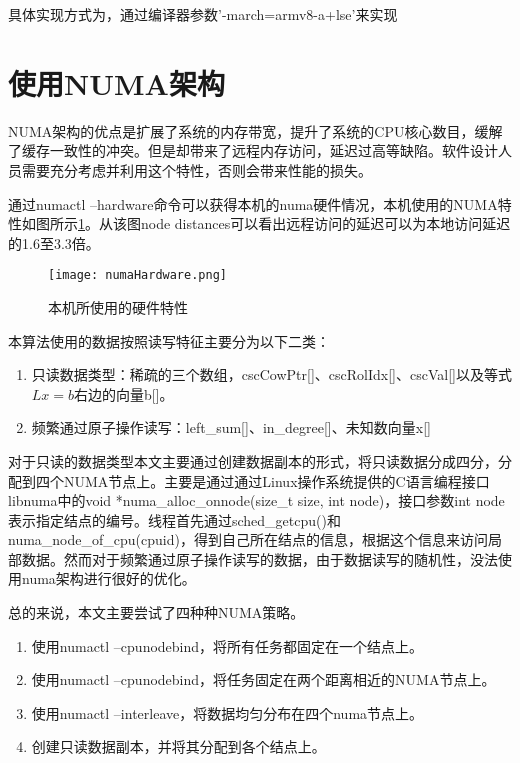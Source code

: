 具体实现方式为，通过编译器参数'-march=armv8-a+lse'来实现

\section{使用NUMA架构}

NUMA架构的优点是扩展了系统的内存带宽，提升了系统的CPU核心数目，缓解了缓存一致性的冲突。但是却带来了远程内存访问，延迟过高等缺陷。软件设计人员需要充分考虑并利用这个特性，否则会带来性能的损失。

通过numactl --hardware命令可以获得本机的numa硬件情况，本机使用的NUMA特性如图所示\ref{numaHardware}。从该图node distances可以看出远程访问的延迟可以为本地访问延迟的1.6至3.3倍。

\begin{figure}[htbp]
    \centering
    \texttt{[image: numaHardware.png]}
    \caption{本机所使用的硬件特性}
    \label{numaHardware}
\end{figure}

本算法使用的数据按照读写特征主要分为以下二类：
\begin{enumerate} \setlength{\itemsep}{0pt}
    \item 只读数据类型：稀疏的三个数组，cscCowPtr[]、cscRolIdx[]、cscVal[]以及等式$Lx=b$右边的向量b[]。
    \item 频繁通过原子操作读写：left\_sum[]、in\_degree[]、未知数向量x[]
\end{enumerate}

对于只读的数据类型本文主要通过创建数据副本的形式，将只读数据分成四分，分配到四个NUMA节点上。主要是通过通过Linux操作系统提供的C语言编程接口\cite{libnuma}libnuma中的void *numa\_alloc\_onnode(size\_t size, int node)，接口参数int node表示指定结点的编号。线程首先通过sched\_getcpu()和numa\_node\_of\_cpu(cpuid)，得到自己所在结点的信息，根据这个信息来访问局部数据。然而对于频繁通过原子操作读写的数据，由于数据读写的随机性，没法使用numa架构进行很好的优化。

总的来说，本文主要尝试了四种种NUMA策略。
\begin{enumerate} \setlength{\itemsep}{0pt}
    \item 使用numactl --cpunodebind，将所有任务都固定在一个结点上。
    \item 使用numactl --cpunodebind，将任务固定在两个距离相近的NUMA节点上。
    \item 使用numactl --interleave，将数据均匀分布在四个numa节点上。
    \item 创建只读数据副本，并将其分配到各个结点上。
\end{enumerate}

